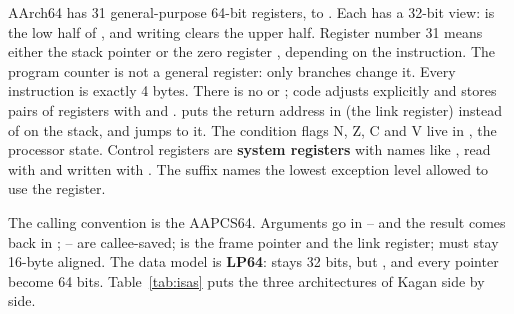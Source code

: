 \documentclass[11pt,a4paper]{article}
\begin{document}
AArch64 has 31 general-purpose 64-bit registers,  to . Each has a 32-bit view:  is the low
half of , and writing  clears the upper half. Register number 31 means either the stack pointer
 or the zero register , depending on the instruction. The program counter is not a general
register: only branches change it. Every instruction is exactly 4 bytes. There is no  or
; code adjusts  explicitly and stores pairs of registers with  and .  puts
the return address in  (the link register) instead of on the stack, and  jumps to it. The
condition flags N, Z, C and V live in , the processor state. Control registers are \textbf{system
registers} with names like , read with  and written with . The suffix
names the lowest exception level allowed to use the register.

The calling convention is the AAPCS64. Arguments go in -- and the result comes back in ;
-- are callee-saved;  is the frame pointer and  the link register;
 must stay 16-byte aligned. The data model is \textbf{LP64}:  stays 32 bits, but ,
 and every pointer become 64 bits. Table~\ref{tab:isas} puts the three architectures of Kagan side by
side.
\end{document}
